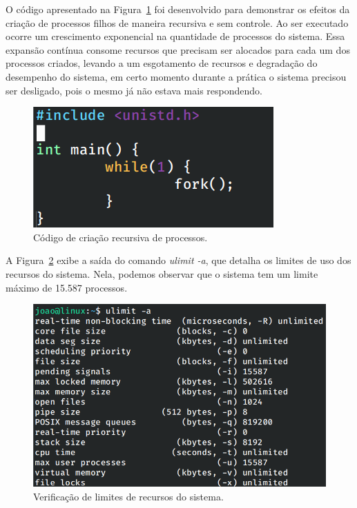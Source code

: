 \documentclass[
	12pt,				%
	oneside,   	        %
	a4paper,			%
	english,			%
	french,				%
	spanish,			%
	brazil,				%
	]{pacotes/abntex2}
\begin{document}
O código apresentado na Figura~\ref{fig:fork} foi desenvolvido para demonstrar os efeitos da criação de processos filhos de maneira recursiva e sem controle. Ao ser executado ocorre um crescimento exponencial na quantidade de processos do sistema. Essa expansão contínua consome recursos que precisam ser alocados para cada um dos processos criados, levando a um esgotamento de recursos e degradação do desempenho do sistema, em certo momento durante a prática o sistema precisou ser desligado, pois o mesmo já não estava mais respondendo.

\begin{figure}[H]
  \centering
  \includegraphics[scale=0.5]{figuras/fork.png}
  \caption{Código de criação recursiva de processos.}
  \label{fig:fork}
\end{figure}

A Figura~\ref{fig:ulimit} exibe a saída do comando \textit{ulimit -a}, que detalha os limites de uso dos recursos do sistema. Nela, podemos observar que o sistema tem um limite máximo de 15.587 processos. 

\begin{figure}[H]
  \centering
  \includegraphics[scale=0.5]{figuras/ulimit.png}
  \caption{Verificação de limites de recursos do sistema.}
  \label{fig:ulimit}
\end{figure}
\end{document}
